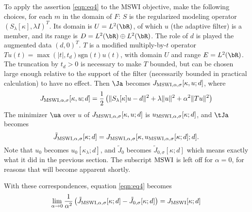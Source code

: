 To apply the assertion \ref{eqn:eq4} to the MSWI objective, make the
following choices, for each $m$ in the domain of $F$: $S$ is the regularized
modeling operator $(S_{\lambda}[\kappa],\lambda I)^T$.  Its domain is $U=L^2(\bR)$, of
which $u$ (the adaptive filter) is a member, and 
its range is $D = L^2(\bR) \oplus
L^2(\bR)$. The role of $d$ is played  the
augmented data $(d,0)^T$. $T$ is a modified multiply-by-$t$ operator
$Tu(t)=\max(|t|, t_d) \mbox{sgn}(t)u(t)$, with domain $U$ and
range $E=L^2(\bR)$. The truncation by $t_d > 0$ is necessary
to make $T$ bounded, but can be chosen large enough relative to the
support of the filter (necessarily bounded in practical calculation)
to have no effect. Then $\Ja$ becomes $J_{{\rm MSWI},\alpha,\sigma}[\kappa,u;d]$, where
\begin{equation}
  \label{eqn:eq5}
   J_{{\rm MSWI},\alpha,\sigma}[\kappa,u;d] = \frac{1}{2}\left(\|S_{\lambda}[\kappa]u-d\|^2 +
   \lambda\|u\|^2 + \alpha^2\|Tu\|^2\right)
 \end{equation}
The minimizer $\ua$ over $u$ of $ J_{{\rm MSWI}, \alpha,\sigma}[\kappa,u;d]$ is
$u_{{\rm MSWI},\alpha,\sigma}[\kappa;d]$, and $\tJa$ becomes
\begin{equation}
  \label{eqn:eq6}
  \tilde{J}_{{\rm MSWI},\alpha,\sigma}[\kappa;d] =
  J_{{\rm MSWI},\alpha,\sigma}[\kappa,u_{{\rm MSWI},\alpha,\sigma}[\kappa;d];d].
\end{equation}
Note that $u_0$ becomes $u_0[\kappa_{\lambda};d]$, and $\tilde{J}_0$ becomes
$\tilde{J}_{0,\sigma}[\kappa;d]$ which means exactly what
it did in the previous section. The subscript ${\rm MSWI}$ is left
off for $\alpha=0$, for reasons that will become apparent shortly.

With these correspondences, equation \ref{eqn:eq4} becomes
\begin{equation}
  \label{eqn:eq7}
  \lim_{\alpha \rightarrow 0}
  \frac{1}{\alpha^2}\left(\tilde{J}_{{\rm MSWI},\alpha,\sigma}[\kappa;d]-\tilde{J}_{0,\sigma}[\kappa;d]\right)=
  J_{\rm MSWI}[\kappa;d]
\end{equation}

